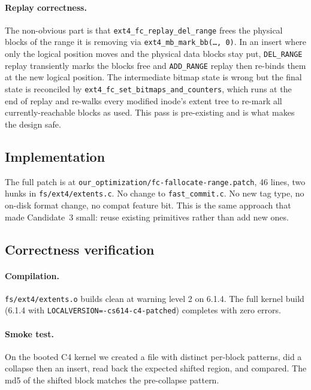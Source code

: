 \documentclass[11pt,a4paper]{article}
\begin{document}
\paragraph{Replay correctness.} The non-obvious part is that
\texttt{ext4\_fc\_replay\_del\_range} frees the physical blocks of
the range it is removing via \texttt{ext4\_mb\_mark\_bb(\ldots, 0)}.
In an insert where only the logical position moves and the physical
data blocks stay put, \texttt{DEL\_RANGE} replay transiently marks
the blocks free and \texttt{ADD\_RANGE} replay then re-binds them at
the new logical position. The intermediate bitmap state is wrong but
the final state is reconciled by
\texttt{ext4\_fc\_set\_bitmaps\_and\_counters}, which runs at the
end of replay and re-walks every modified inode's extent tree to
re-mark all currently-reachable blocks as used. This pass is
pre-existing and is what makes the design safe.

\subsection{Implementation}

The full patch is at \texttt{our\_optimization/fc-fallocate-range.patch},
46 lines, two hunks in \texttt{fs/ext4/extents.c}. No change to
\texttt{fast\_commit.c}. No new tag type, no on-disk format change,
no compat feature bit. This is the same approach that made
Candidate~3 small: reuse existing primitives rather than add new
ones.

\subsection{Correctness verification}

\paragraph{Compilation.} \texttt{fs/ext4/extents.o} builds clean at
warning level 2 on 6.1.4. The full kernel build (6.1.4 with
\texttt{LOCALVERSION=-cs614-c4-patched}) completes with zero errors.

\paragraph{Smoke test.} On the booted C4 kernel we created a file
with distinct per-block patterns, did a collapse then an insert,
read back the expected shifted region, and compared. The md5 of the
shifted block matches the pre-collapse pattern.
\end{document}
